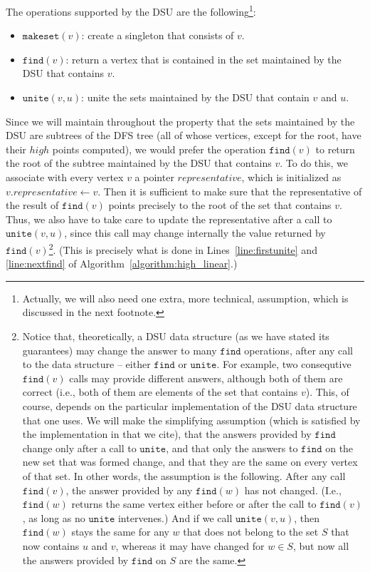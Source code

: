 \documentclass[11pt,a4paper]{article}
\begin{document}
The operations supported by the DSU are the following\footnote{Actually, we will also need one extra, more technical, assumption, which is discussed in the next footnote.}:

\begin{itemize}
\item{$\mathtt{makeset}(v)$: create a singleton that consists of $v$.}
\item{$\mathtt{find}(v)$: return a vertex that is contained in the set maintained by the DSU that contains $v$.}
\item{$\mathtt{unite}(v,u)$: unite the sets maintained by the DSU that contain $v$ and $u$.}
\end{itemize}

Since we will maintain throughout the property that the sets maintained by the DSU are subtrees of the DFS tree (all of whose vertices, except for the root, have their $\mathit{high}$ points computed), we would prefer the operation $\mathtt{find}(v)$ to return the root of the subtree maintained by the DSU that contains $v$. To do this, we associate with every vertex $v$ a pointer $\mathit{representative}$, which is initialized as $v.\mathit{representative}\leftarrow v$. Then it is sufficient to make sure that the representative of the result of $\mathtt{find}(v)$ points precisely to the root of the set that contains $v$. Thus, we also have to take care to update the representative after a call to $\mathtt{unite}(v,u)$, since this call may change internally the value returned by $\mathtt{find}(v)$\footnote{Notice that, theoretically, a DSU data structure (as we have stated its guarantees) may change the answer to many $\mathtt{find}$ operations, after any call to the data structure -- either $\mathtt{find}$ or $\mathtt{unite}$. For example, two consequtive $\mathtt{find}(v)$ calls may provide different answers, although both of them are correct (i.e., both of them are elements of the set that contains $v$). This, of course, depends on the particular implementation of the DSU data structure that one uses. We will make the simplifying assumption (which is satisfied by the implementation in \cite{DBLP:journals/jcss/GabowT85} that we cite), that the answers provided by $\mathtt{find}$ change only after a call to $\mathtt{unite}$, and that only the answers to $\mathtt{find}$ on the new set that was formed change, and that they are the same on every vertex of that set. In other words, the assumption is the following. After any call $\mathtt{find}(v)$, the answer provided by any $\mathtt{find}(w)$ has not changed. (I.e., $\mathtt{find}(w)$ returns the same vertex either before or after the call to $\mathtt{find}(v)$, as long as no $\mathtt{unite}$ intervenes.) And if we call $\mathtt{unite}(v,u)$, then $\mathtt{find}(w)$ stays the same for any $w$ that does not belong to the set $S$ that now contains $u$ and $v$, whereas it may have changed for $w\in S$, but now all the answers provided by $\mathtt{find}$ on $S$ are the same.}. (This is precisely what is done in Lines~\ref{line:firstunite} and \ref{line:nextfind} of Algorithm~\ref{algorithm:high_linear}.)
\end{document}

